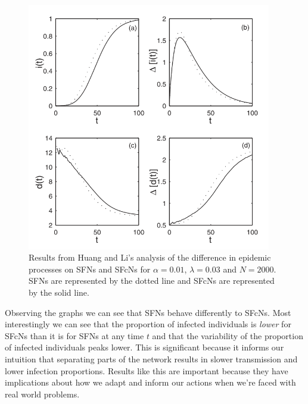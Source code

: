\begin{figure}
    \begin{center}
        \includegraphics[width=0.95\textwidth]{img/si}
    \end{center}
    \caption{Results from Huang and Li's analysis of the difference in epidemic processes on SFNs and SFcNs for $\alpha = 0.01$, $\lambda = 0.03$ and $N = 2000$. SFNs are represented by the dotted line and SFcNs are represented by the solid line.}
    \label{fig:si}
\end{figure}

Observing the graphs we can see that SFNs behave differently to SFcNs. Most interestingly we can see that the proportion of infected individuals is \emph{lower} for SFcNs than it is for SFNs at any time $t$ and that the variability of the proportion of infected individuals peaks lower. This is significant because it informs our intuition that separating parts of the network results in slower transmission and lower infection proportions. Results like this are important because they have implications about how we adapt and inform our actions when we're faced with real world problems.
